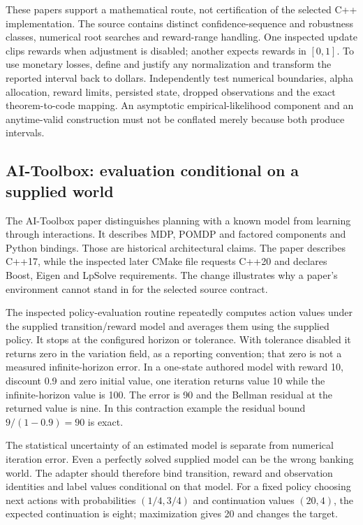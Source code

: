 These papers support a mathematical route, not certification of the selected C++ implementation. The source contains distinct confidence-sequence and robustness classes, numerical root searches and reward-range handling. One inspected update clips rewards when adjustment is disabled; another expects rewards in $[0,1]$. To use monetary losses, define and justify any normalization and transform the reported interval back to dollars. Independently test numerical boundaries, alpha allocation, reward limits, persisted state, dropped observations and the exact theorem-to-code mapping. An asymptotic empirical-likelihood component and an anytime-valid construction must not be conflated merely because both produce intervals.~\citep{exec24_policycxx_vw,exec24_policycxx_cs2021,exec24_policycxx_anytime2024,exec24_policycxx_comparison}

\subsection{AI-Toolbox: evaluation conditional on a supplied world}
The AI-Toolbox paper distinguishes planning with a known model from learning through interactions. It describes MDP, POMDP and factored components and Python bindings. Those are historical architectural claims. The paper describes C++17, while the inspected later CMake file requests C++20 and declares Boost, Eigen and LpSolve requirements. The change illustrates why a paper's environment cannot stand in for the selected source contract.~\citep{exec24_policycxx_aitoolbox_paper,exec24_policycxx_aitoolbox}

The inspected policy-evaluation routine repeatedly computes action values under the supplied transition/reward model and averages them using the supplied policy. It stops at the configured horizon or tolerance. With tolerance disabled it returns zero in the variation field, as a reporting convention; that zero is not a measured infinite-horizon error. In a one-state authored model with reward 10, discount 0.9 and zero initial value, one iteration returns value 10 while the infinite-horizon value is 100. The error is 90 and the Bellman residual at the returned value is nine. In this contraction example the residual bound $9/(1-0.9)=90$ is exact.~\citep{exec24_policycxx_aitoolbox,exec24_policycxx_comparison}

The statistical uncertainty of an estimated model is separate from numerical iteration error. Even a perfectly solved supplied model can be the wrong banking world. The adapter should therefore bind transition, reward and observation identities and label values conditional on that model. For a fixed policy choosing next actions with probabilities $(1/4,3/4)$ and continuation values $(20,4)$, the expected continuation is eight; maximization gives 20 and changes the target.~\citep{exec24_policycxx_comparison}


